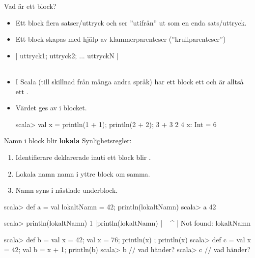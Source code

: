 \begin{Slide}{Vad är ett block?}

\begin{itemize}
\item Ett block  flera satser/uttryck och ser ''utifrån'' ut som en enda sats/uttryck.

\item Ett block skapas med hjälp av klammerparenteser (''krullparenteser'')

\item [] {\fontsize{14}{18}\selectfont \code|{ uttryck1; uttryck2; ... uttryckN }|}\\~

\pause

\item I Scala (till skillnad från många andra språk) har ett block ett  och är alltså ett .

\item Värdet ges av  i blocket.

\begin{REPLnonum}
scala> val x = { println(1 + 1); println(2 + 2); 3 + 3 }
2
4
x: Int = 6
\end{REPLnonum}


\end{itemize}

\end{Slide}

\begin{Slide}{Namn i block blir \textbf{lokala}}
Synlighetsregler:
\begin{enumerate}
\item Identifierare deklarerade inuti ett block blir .

\item Lokala namn  namn i yttre block om samma.


\item Namn syns i nästlade underblock.

\end{enumerate}

\begin{REPL}
scala> def a = { val lokaltNamn = 42; println(lokaltNamn) }
scala> a 
42

scala> println(lokaltNamn)                                                                                                                  
1 |println(lokaltNamn)
  |        ^^^^^^^^^^
  |        Not found: lokaltNamn

scala> def b = { val x = 42; { val x = 76; println(x) }; println(x) }
scala> def c = { val x = 42; { val b = x + 1; println(b) } }
scala> b  // vad händer?
scala> c  // vad händer?
\end{REPL}

\end{Slide}


